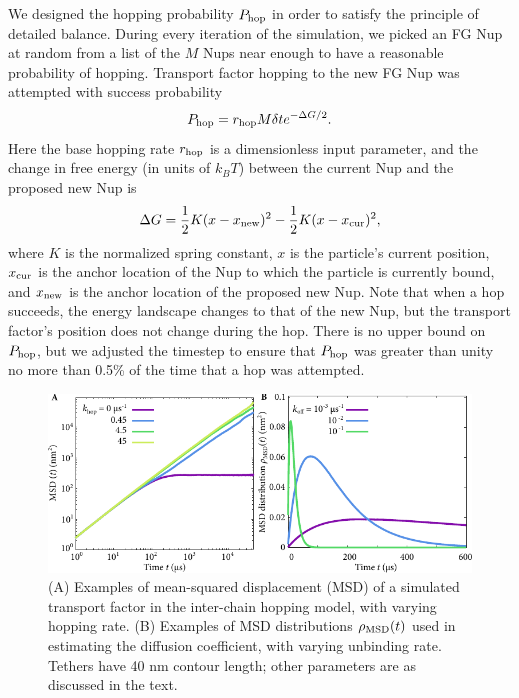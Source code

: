 We designed the hopping probability $P_{\rm hop}$ in order to satisfy the principle of detailed balance.  During every iteration of the simulation, we picked an FG Nup at random from a list of the $M$  Nups near enough to have a reasonable probability of hopping. Transport factor hopping to the new FG Nup was attempted with success probability
\begin{equation}
P_{\rm hop} = r_{\mathrm{hop}} M \delta t e^{-\Delta G /2}.
\end{equation}
Here the base hopping rate $r_{\mathrm{hop}}$ is a dimensionless input parameter, and the change in free energy (in units of $k_BT$) between the current Nup and the proposed new Nup is
\begin{equation}
  \Delta G = \frac{1}{2} K (x-x_{\mathrm{new}})^2 - \frac{1}{2} K (x -
  x_{\mathrm{cur}})^2,
\end{equation}
where $K$ is the normalized spring constant, $x$ is the particle's current position, $x_{\mathrm{cur}}$ is the anchor location of the Nup to which the particle is currently bound, and $x_{\mathrm{new}}$ is the anchor location of the proposed new Nup. Note that when a hop succeeds, the energy landscape changes to that of the new Nup, but the transport factor's position does not change during the hop.  There is no upper bound on $P_{\rm hop}$, but we adjusted the timestep to ensure that $P_{\rm hop}$ was greater than
unity no more than 0.5\% of the time that a hop was attempted.
\begin{figure}[t!]
\centering
\includegraphics[width=0.7\linewidth]{figs/ch02/integrand-example-plots.pdf}
\caption[Mean-squared displacement in the hopping simulation.]{(A) Examples of mean-squared displacement (MSD) of a simulated transport factor in the inter-chain hopping model, with varying hopping rate.  (B) Examples of MSD distributions $\rho_{\mathrm{MSD}} (t)$ used in estimating the diffusion coefficient, with varying unbinding rate. Tethers have 40 nm contour length; other parameters are as discussed in the text.}
\label{fig:integrand}
\end{figure}


